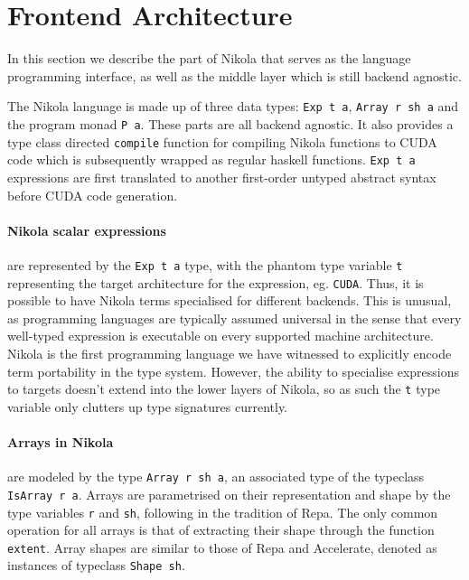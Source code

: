 \section{Frontend Architecture}

In this section we describe the part of Nikola that serves as the language
programming interface, as well as the middle layer which is still backend
agnostic.

The Nikola language is made up of three data types: \texttt{Exp t a},
\texttt{Array r sh a} and the program monad \texttt{P a}. These parts are all
backend agnostic. It also provides a type class directed \texttt{compile}
function for compiling Nikola functions to CUDA code which is subsequently
wrapped as regular haskell functions. \texttt{Exp t a} expressions are first
translated to another first-order untyped abstract syntax before CUDA code
generation.

\paragraph{Nikola scalar expressions} are represented by the \texttt{Exp t a} type, with
the phantom type variable \texttt{t} representing the target architecture for
the expression, eg.  \texttt{CUDA}. Thus, it is possible to have Nikola terms
specialised for different backends. This is unusual, as programming languages
are typically assumed universal in the sense that every well-typed expression
is executable on every supported machine architecture. Nikola is the first
programming language we have witnessed to explicitly encode term portability in
the type system. However, the ability to specialise expressions to targets
doesn't extend into the lower layers of Nikola, so as such the \texttt{t} type
variable only clutters up type signatures currently.

\paragraph{Arrays in Nikola} are modeled by the type \texttt{Array r sh a}, an associated
type of the typeclass \texttt{IsArray r a}. Arrays are parametrised on their
representation and shape by the type variables \texttt{r} and \texttt{sh},
following in the tradition of Repa. The only common operation for all arrays is
that of extracting their shape through the function \texttt{extent}. Array
shapes are similar to those of Repa and Accelerate, denoted as instances of
typeclass \texttt{Shape sh}.

